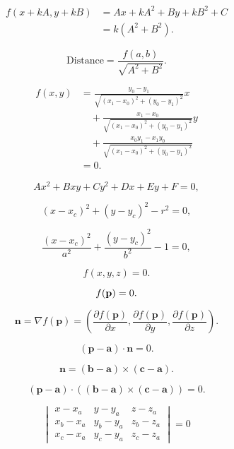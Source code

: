 \documentclass[lang=cn,12pt,marginpar=margintrue]{elegantbook}
\begin{document}
\begin{equation}
  \begin{aligned}
    f(x+k A,y+k B) & =A x+k A^{2}+B y+k B^{2}+C \\
                   & =k(A^{2}+B^{2}).
  \end{aligned}
\end{equation}

\[
  \mathrm{Distance}={\frac{f(a,b)}{\sqrt{A^{2}+B^{2}}}}.
\]

\begin{equation}
  \begin{aligned}
    f(x,y) & ={\frac{y_{0}-y_{1}}{\sqrt{(x_{1}-x_{0})^{2}+(y_{0}-y_{1})^{2}}}}x               \\
           & \quad+{\frac{x_{1}-x_{0}}{\sqrt{(x_{1}-x_{0})^{2}+(y_{0}-y_{1})^{2}}}}y          \\
           & \quad+{\frac{x_{0}y_{1}-x_{1}y_{0}}{\sqrt{(x_{1}-x_{0})^{2}+(y_{0}-y_{1})^{2}}}} \\
           & =0.
  \end{aligned}
\end{equation}

\[
  A x^{2}+B x y+C y^{2}+D x+E y+F=0,
\]

\[
  (x-x_{c})^{2}+(y-y_{c})^{2}-r^{2}=0,
\]

\[
  {\frac{(x-x_{c})^{2}}{a^{2}}}+{\frac{(y-y_{c})^{2}}{b^{2}}}-1=0,
\]

\[
  f(x,y,z)=0.
\]

\[
  f({\bf p})=0.
\]

\[
  \mathbf{n}=\nabla f(\mathbf{p})=\left({\frac{\partial f(\mathbf{p})}{\partial x}},{\frac{\partial f(\mathbf{p})}{\partial y}},{\frac{\partial f(\mathbf{p})}{\partial z}}\right).
\]

\begin{equation}
  (\mathbf{p}-\mathbf{a})\cdot\mathbf{n}=0.
\end{equation}

\[
  \mathbf{n}=(\mathbf{b}-\mathbf{a})\times(\mathbf{c}-\mathbf{a}).
\]

\begin{equation}
  (\mathbf{p}-\mathbf{a})\cdot((\mathbf{b}-\mathbf{a})\times(\mathbf{c}-\mathbf{a}))=0.
\end{equation}

\begin{equation}
  \begin{vmatrix}
    x-x_a   & y-y_a   & z-z_a   \\
    x_b-x_a & y_b-y_a & z_b-z_a \\
    x_c-x_a & y_c-y_a & z_c-z_a
  \end{vmatrix}=0
\end{equation}
\end{document}
